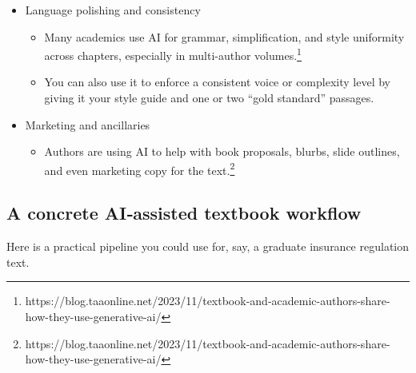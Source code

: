 \documentclass[
  11pt,
]{article}
\providecommand{\tightlist}{%
  \setlength{\itemsep}{0pt}\setlength{\parskip}{0pt}}
\begin{document}
\begin{itemize}
  \begin{itemize}
  \tightlist
  \item
    Authors report using AI to propose learning objectives, key terms, chapter summaries, and discussion questions based on an existing chapter draft.\footnote{https://blog.taaonline.net/2023/11/textbook-and-academic-authors-share-how-they-use-generative-ai/}
  \item
    You then vet these for correctness, level, and alignment with your course.
  \end{itemize}
\item
  Language polishing and consistency

  \begin{itemize}
  \tightlist
  \item
    Many academics use AI for grammar, simplification, and style uniformity across chapters, especially in multi-author volumes.\footnote{https://blog.taaonline.net/2023/11/textbook-and-academic-authors-share-how-they-use-generative-ai/}
  \item
    You can also use it to enforce a consistent voice or complexity level by giving it your style guide and one or two ``gold standard'' passages.
  \end{itemize}
\item
  Marketing and ancillaries

  \begin{itemize}
  \tightlist
  \item
    Authors are using AI to help with book proposals, blurbs, slide outlines, and even marketing copy for the text.\footnote{https://blog.taaonline.net/2023/11/textbook-and-academic-authors-share-how-they-use-generative-ai/}
  \end{itemize}
\end{itemize}

\subsection{A concrete AI‑assisted textbook workflow}\label{a-concrete-aiassisted-textbook-workflow}

Here is a practical pipeline you could use for, say, a graduate insurance regulation text.
\end{document}
